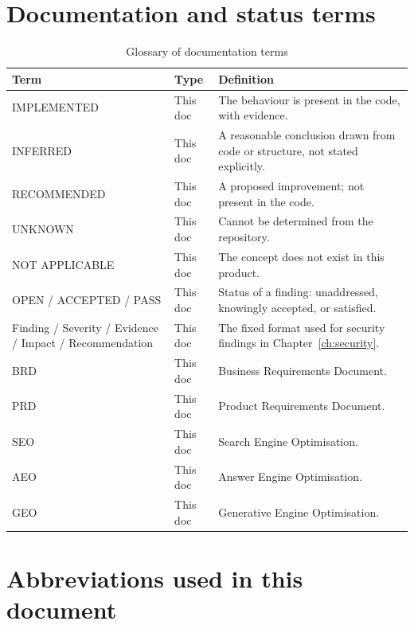 \section{Documentation and status terms}

\begin{longtable}{p{3.8cm}p{1.6cm}p{8.8cm}}
\caption{Glossary of documentation terms}\\
\toprule
\textbf{Term} & \textbf{Type} & \textbf{Definition} \\
\midrule

IMPLEMENTED & This doc & The behaviour is present in the code, with evidence. \\
INFERRED & This doc & A reasonable conclusion drawn from code or structure, not
stated explicitly. \\
RECOMMENDED & This doc & A proposed improvement; not present in the code. \\
UNKNOWN & This doc & Cannot be determined from the repository. \\
NOT APPLICABLE & This doc & The concept does not exist in this product. \\
OPEN / ACCEPTED / PASS & This doc & Status of a finding: unaddressed, knowingly
accepted, or satisfied. \\
Finding / Severity / Evidence / Impact / Recommendation & This doc & The fixed
format used for security findings in Chapter~\ref{ch:security}. \\
BRD & This doc & Business Requirements Document. \\
PRD & This doc & Product Requirements Document. \\
SEO & This doc & Search Engine Optimisation. \\
AEO & This doc & Answer Engine Optimisation. \\
GEO & This doc & Generative Engine Optimisation. \\
\bottomrule
\end{longtable}

\section{Abbreviations used in this document}

